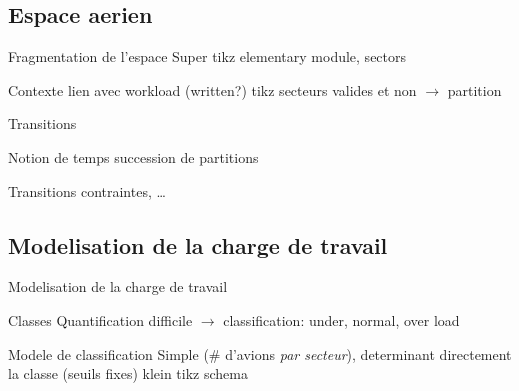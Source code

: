 \documentclass[tikz]{beamer}
\begin{document}
\subsection{Espace aerien}
\begin{frame}{Fragmentation de l'espace}
  Super tikz elementary module, sectors
\end{frame}
\begin{frame}{Contexte}
  lien avec workload (written?)
  tikz secteurs valides et non \(\rightarrow\) partition
\end{frame}
\begin{frame}{Transitions}
  \begin{block}{Notion de temps}
    succession de partitions
  \end{block}
  \begin{block}{Transitions}
    contraintes, \dots
  \end{block}
\end{frame}

\subsection{Modelisation de la charge de travail}
\begin{frame}{Modelisation de la charge de travail}
  \begin{block}
    {Classes}
    Quantification difficile \(\rightarrow\) classification: under, normal,
    over load
  \end{block}
  \begin{block}
    {Modele de classification}
    Simple (\# d'avions \emph{par secteur}), determinant directement la
    classe (seuils fixes) klein tikz schema
  \end{block}
\end{frame}
\end{document}
